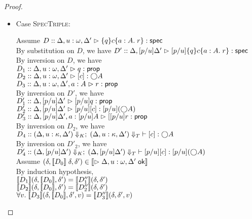\begin{proof}
\begin{enumerate}
  \begin{itemize}
  \item Case \textsc{SpecTriple}: 
    \begin{tabbedproof}
      \oo Assume $D :: \judgeS[{\Delta, u:\omega, \Delta'}]{\spec{q}{c}{a:A}{r}}$ \\
      \oo By substitution on $D$, we have $D' :: \judgeS[{\Delta, [p/u]\Delta'}]{[p/u]\spec{q}{c}{a:A}{r}}$ \\
      \oo By inversion on $D$, we have \\
      \ooo $D_1 :: \judgeA[{\Delta, u:\omega, \Delta'}]{q}{\assert}$ \\
      \ooo $D_2 :: \judgeA[{\Delta, u:\omega, \Delta'}]{\comp{c}}{\monad{A}}$ \\
      \ooo $D_3 :: \judgeA[{\Delta, u:\omega, \Delta', a:A}]{r}{\assert}$ \\
      \oo By inversion on $D'$, we have \\ 
      \ooo $D'_1 :: \judgeA[{\Delta, [p/u]\Delta'}]{[p/u]q}{\assert}$ \\                  
      \ooo $D'_2 :: \judgeA[{\Delta, [p/u]\Delta'}]{[p/u]\comp{c}}{[p/u](\monad{A})}$ \\  
      \ooo $D'_3 :: \judgeA[{\Delta, [p/u]\Delta', a:[p/u]A}]{[[p/u]r}{\assert}$ \\       
      \oo By inversion on $D_2$, we have \\
      \ooo $D_4 :: \judgeE[\restrictkind{\Delta,u:\kappa,\Delta'}]
                           {\restricttype{\Delta,u:\kappa,\Delta'}}{\comp{c}}{\monad{A}}$ \\
      \oo By inversion on $D'_2$, we have \\
      \ooo $D'_4 :: \judgeE[\restrictkind{\Delta,[p/u]\Delta'}]
                           {\restricttype{\Delta,[p/u]\Delta'}}{[p/u]\comp{c}}{[p/u](\monad{A})}$ \\
      \oo Assume $(\delta, \interp{D_0}\;\delta, \delta')\in \interp{\judgeACtx{\Delta, u:\omega, \Delta'}}$ \\
      \ooo By induction hypothesis, \\
      \oooo $\interp{D_1}(\delta, \interp{D_0}, \delta') = \interp{D''_1}(\delta, \delta')$\\
      \oooo $\interp{D_2}(\delta, \interp{D_0}, \delta') = \interp{D''_2}(\delta, \delta')$\\
      \oooo $\forall v.\; \interp{D_3}(\delta, \interp{D_0}, \delta', v) = \interp{D''_3}(\delta, \delta', v)$\\

\end{tabbedproof}
\end{itemize}
\end{enumerate}
\end{proof}
